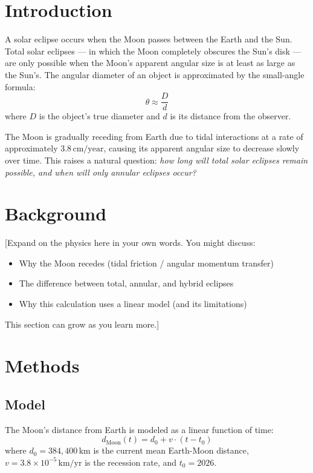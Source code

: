 \documentclass[11pt]{article}
\begin{document}
\section*{Introduction}

A solar eclipse occurs when the Moon passes between the Earth and the Sun.
Total solar eclipses — in which the Moon completely obscures the Sun's disk —
are only possible when the Moon's apparent angular size is at least as large as the Sun's.
The angular diameter of an object is approximated by the small-angle formula:
\[
    \theta \approx \frac{D}{d}
\]
where $D$ is the object's true diameter and $d$ is its distance from the observer.

The Moon is gradually receding from Earth due to tidal interactions at a rate of
approximately $3.8\,\text{cm/year}$, causing its apparent angular size to decrease
slowly over time.
This raises a natural question: \textit{how long will total solar eclipses remain
possible, and when will only annular eclipses occur?}

\section*{Background}

[Expand on the physics here in your own words.
You might discuss:
\begin{itemize}
    \item Why the Moon recedes (tidal friction / angular momentum transfer)
    \item The difference between total, annular, and hybrid eclipses
    \item Why this calculation uses a linear model (and its limitations)
\end{itemize}
This section can grow as you learn more.]

\section*{Methods}

\subsection*{Model}

The Moon's distance from Earth is modeled as a linear function of time:
\[
    d_\mathrm{Moon}(t) = d_0 + v \cdot (t - t_0)
\]
where $d_0 = 384{,}400\,\text{km}$ is the current mean Earth-Moon distance,
$v = 3.8 \times 10^{-5}\,\text{km/yr}$ is the recession rate,
and $t_0 = 2026$.
\end{document}
